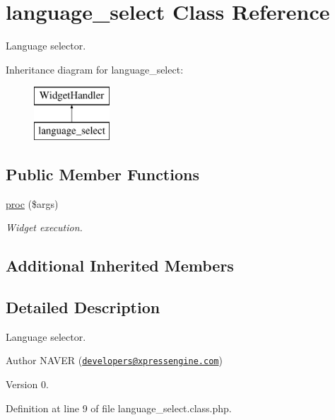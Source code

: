\hypertarget{classlanguage__select}{\section{language\+\_\+select Class Reference}
\label{classlanguage__select}
}


Language selector.  


Inheritance diagram for language\+\_\+select\+:\begin{figure}[H]
\begin{center}
\leavevmode
\includegraphics[height=2.000000cm]{classlanguage__select}
\end{center}
\end{figure}
\subsection*{Public Member Functions}
\begin{DoxyCompactItemize}
\item 
\hyperlink{classlanguage__select_a6c93581389af6a3ca6d149d384196479}{proc} (\$args)
\begin{DoxyCompactList}\small\item\em Widget execution. \end{DoxyCompactList}\end{DoxyCompactItemize}
\subsection*{Additional Inherited Members}


\subsection{Detailed Description}
Language selector. 

\begin{DoxyAuthor}{Author}
N\+A\+V\+E\+R (\href{mailto:developers@xpressengine.com}{\tt developers@xpressengine.\+com}) 
\end{DoxyAuthor}
\begin{DoxyVersion}{Version}
0. 
\end{DoxyVersion}


Definition at line 9 of file language\+\_\+select.\+class.\+php.



